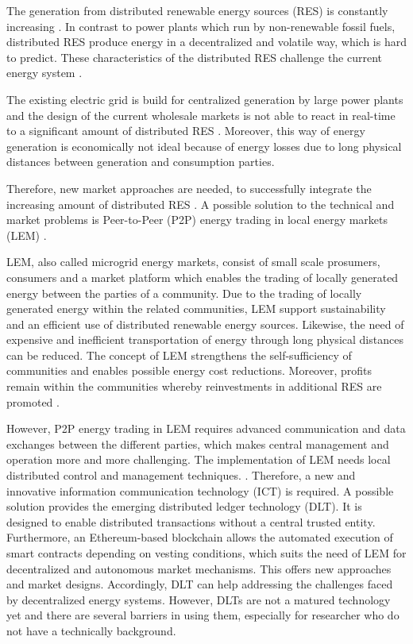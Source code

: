 
The generation from distributed renewable energy sources (RES) is constantly increasing . In contrast to power plants which run by non-renewable fossil fuels, distributed RES produce energy in a decentralized and volatile way, which is hard to predict. These characteristics of the distributed RES challenge the current energy system .

The existing electric grid is build for centralized generation by large power plants and the design of the current wholesale markets is not able to react in real-time to a significant amount of distributed RES  . Moreover, this way of energy generation is economically not ideal because of energy losses due to long physical distances between generation and consumption parties. 

Therefore, new market approaches are needed, to successfully integrate the increasing amount of distributed RES . A possible solution to the technical and market problems is Peer-to-Peer (P2P) energy trading in local energy markets (LEM) . 

LEM, also called microgrid energy markets, consist of small scale prosumers, consumers and a market platform which enables the trading of locally generated energy between the parties of a community. Due to the trading of locally generated energy within the related communities, LEM support sustainability and an efficient use of distributed renewable energy sources. Likewise, the need of expensive and inefficient transportation of energy through long physical distances can be reduced. The concept of LEM strengthens the self-sufficiency of communities and enables possible energy cost reductions. Moreover, profits remain within the communities whereby reinvestments in additional RES are promoted . 

However, P2P energy trading in LEM requires advanced communication and data exchanges between the different parties, which makes central management and operation more and more challenging. The implementation of LEM needs local distributed control and management techniques. . Therefore, a new and innovative information communication technology (ICT) is required.  A possible solution provides the emerging distributed ledger technology (DLT). It is designed to enable distributed transactions without a central trusted entity. Furthermore, an Ethereum-based blockchain allows the automated execution of smart contracts depending on vesting conditions, which suits the need of LEM for decentralized and autonomous market mechanisms. This offers new approaches and market designs. Accordingly, DLT can help addressing the challenges faced by decentralized energy systems. However, DLTs are not a matured technology yet and there are several barriers in using them, especially for researcher who do not have a technically background. 

